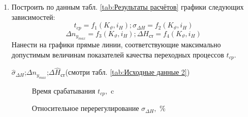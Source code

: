 \documentclass[a4paper,12pt]{article}
\begin{document}
\begin{enumerate}
    \item Построить по данным табл. \ref{tab:Результаты расчётов} графики следующих зависимостей:
    $$t_{cp}=f_1(K_{\vartheta},i_H);\sigma_{\Delta H}=f_2(K_{\vartheta},i_H)$$
    $$\Delta n_{y_{max}}=f_3(K_{\vartheta},i_H);\Delta H_{\text{ст}}=f_4(K_{\vartheta},i_H)$$
    Нанести   на   графики   прямые   линии,   соответствующие   максимально допустимым величинам показателей качества переходных процессов  $t_{cp}$. 

    $\hat{\sigma}_{\Delta H}$;$\Delta n_{y_{max}}$;$\Delta \hat{H}_{\text{ст}}$(смотри табл. \ref{tab:Исходные данные 2})
    
    \begin{figure}[H]     %
        \caption{Время срабатывания $t_{cp},$ c}
        \label{fig:Время срабатывания}
    \end{figure}
    
    \begin{figure}[H]
        \caption{Относительное перерегулирование $\sigma_{\Delta H},$ \%}
        \label{fig:Относительное перерегулирование}
    \end{figure}
    

\end{enumerate}
\end{document}
